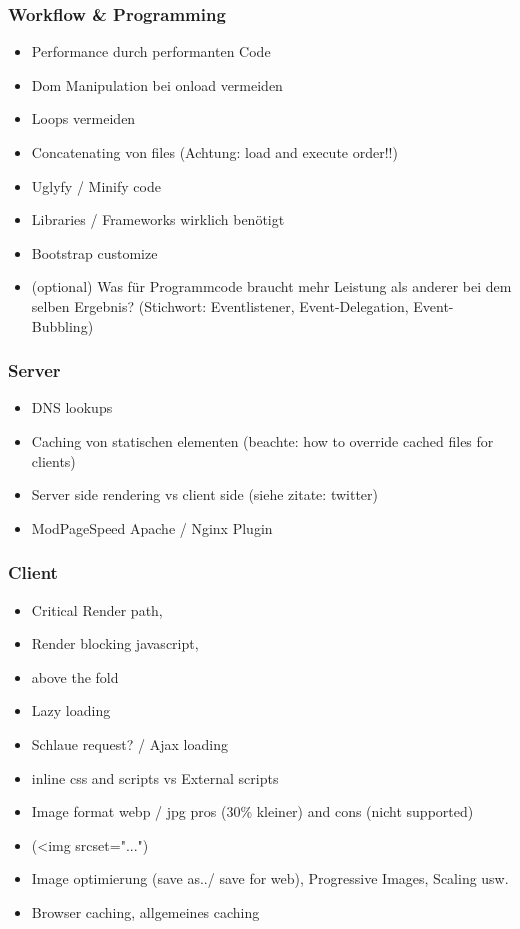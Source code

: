 \documentclass[a4paper,11pt,singlespacing]{article}
\begin{document}
		\subsubsection{Workflow \& Programming} %
		\label{ssub:workflow_programming}
		\begin{itemize}
			\item Performance durch performanten Code
			\item Dom Manipulation bei onload vermeiden
			\item Loops vermeiden
			\item Concatenating von files (Achtung: load and execute order!!)
			\item Uglyfy / Minify code
			\item Libraries / Frameworks wirklich benötigt
			\item Bootstrap customize
			\item (optional) Was für Programmcode braucht mehr Leistung als anderer bei dem selben Ergebnis? (Stichwort: Eventlistener, Event-Delegation, Event-Bubbling)
		\end{itemize}
	

		\subsubsection{Server} %
		\label{ssub:server}
		\begin{itemize}
			\item DNS lookups
			\item Caching von statischen elementen (beachte: how to override cached files for clients)
			\item Server side rendering vs client side (siehe zitate: twitter)
			\item ModPageSpeed Apache / Nginx Plugin
		\end{itemize}	
		

		\subsubsection{Client} %
		\label{ssub:client}
		\begin{itemize}
			\item Critical Render path, 
			\item Render blocking javascript, 
			\item above the fold
			\item Lazy loading
			\item Schlaue request? / Ajax loading
			\item inline css and scripts vs External scripts
			\item Image format webp / jpg pros (30\% kleiner) and cons (nicht supported)
			\item (<img srcset="...")
			\item Image optimierung (save as../ save for web), Progressive Images, Scaling usw.
			\item Browser caching, allgemeines caching
		\end{itemize}
\end{document}

